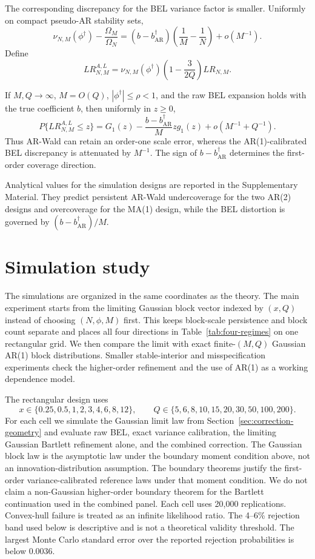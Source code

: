 \documentclass[12pt]{article}
\theoremstyle{remark}
\begin{document}
The corresponding discrepancy for the BEL variance factor is smaller. Uniformly on compact pseudo-AR stability sets,
\begin{equation}
\nu_{N,M}(\phi^\dagger)-\frac{\Omega_M}{\Omega_N}
=(b-b_{\mathrm{AR}}^\dagger)\left(\frac1M-\frac1N\right)+o(M^{-1}).
\label{eq:ar-vc-misspec-gap}
\end{equation}
Define
\[
LR^{A,L}_{N,M}
=\nu_{N,M}(\phi^\dagger)\left(1-\frac{3}{2Q}\right)LR_{N,M}.
\]

If $M,Q\to\infty$, $M=O(Q)$, $|\phi^\dagger|\le\rho<1$, and the raw BEL expansion holds with the true coefficient $b$, then uniformly in $z\ge0$,
\begin{equation}
P\{LR^{A,L}_{N,M}\le z\}
=G_1(z)-\frac{b-b_{\mathrm{AR}}^\dagger}{M}zg_1(z)
+o(M^{-1}+Q^{-1}).
\label{eq:ar-bel-misspec-expansion}
\end{equation}
Thus AR-Wald can retain an order-one scale error, whereas the AR(1)-calibrated BEL discrepancy is attenuated by $M^{-1}$. The sign of $b-b_{\mathrm{AR}}^\dagger$ determines the first-order coverage direction.

Analytical values for the simulation designs are reported in the Supplementary Material. They predict persistent AR-Wald undercoverage for the two AR(2) designs and overcoverage for the MA(1) design, while the BEL distortion is governed by $(b-b_{\mathrm{AR}}^\dagger)/M$.


\section{Simulation study}
\label{sec:simulation}
The simulations are organized in the same coordinates as the theory. The main experiment starts from the limiting Gaussian block vector indexed by $(x,Q)$ instead of choosing $(N,\phi,M)$ first. This keeps block-scale persistence and block count separate and places all four directions in Table~\ref{tab:four-regimes} on one rectangular grid. We then compare the limit with exact finite-$(M,Q)$ Gaussian AR(1) block distributions. Smaller stable-interior and misspecification experiments check the higher-order refinement and the use of AR(1) as a working dependence model.

The rectangular design uses
\[
x\in\{0.25,0.5,1,2,3,4,6,8,12\},
\qquad
Q\in\{5,6,8,10,15,20,30,50,100,200\}.
\]
For each cell we simulate the Gaussian limit law from Section~\ref{sec:correction-geometry} and evaluate raw BEL, exact variance calibration, the limiting Gaussian Bartlett refinement alone, and the combined correction. The Gaussian block law is the asymptotic law under the boundary moment condition above, not an innovation-distribution assumption. The boundary theorems justify the first-order variance-calibrated reference laws under that moment condition. We do not claim a non-Gaussian higher-order boundary theorem for the Bartlett continuation used in the combined panel. Each cell uses 20,000 replications. Convex-hull failure is treated as an infinite likelihood ratio. The 4--6\% rejection band used below is descriptive and is not a theoretical validity threshold. The largest Monte Carlo standard error over the reported rejection probabilities is below $0.0036$.
\end{document}
